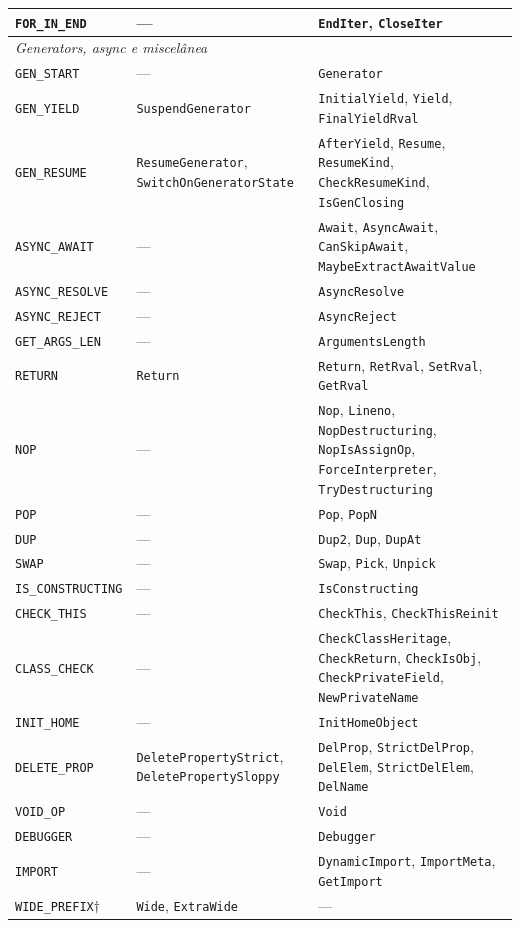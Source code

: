 {\begin{longtable}{@{}p{4.2cm}p{5.3cm}p{5.3cm}@{}}
\texttt{FOR\_IN\_END} & --- & \texttt{EndIter}, \texttt{CloseIter} \\
\midrule
\multicolumn{3}{l}{\textit{Generators, async e miscelânea}} \\
\midrule
\texttt{GEN\_START} & --- & \texttt{Generator} \\
\texttt{GEN\_YIELD} & \texttt{SuspendGenerator} & \texttt{InitialYield}, \texttt{Yield}, \texttt{FinalYieldRval} \\
\texttt{GEN\_RESUME} & \texttt{ResumeGenerator}, \texttt{SwitchOnGeneratorState} & \texttt{AfterYield}, \texttt{Resume}, \texttt{ResumeKind}, \texttt{CheckResumeKind}, \texttt{IsGenClosing} \\
\texttt{ASYNC\_AWAIT} & --- & \texttt{Await}, \texttt{AsyncAwait}, \texttt{CanSkipAwait}, \texttt{MaybeExtractAwaitValue} \\
\texttt{ASYNC\_RESOLVE} & --- & \texttt{AsyncResolve} \\
\texttt{ASYNC\_REJECT} & --- & \texttt{AsyncReject} \\
\texttt{GET\_ARGS\_LEN} & --- & \texttt{ArgumentsLength} \\
\texttt{RETURN} & \texttt{Return} & \texttt{Return}, \texttt{RetRval}, \texttt{SetRval}, \texttt{GetRval} \\
\texttt{NOP} & --- & \texttt{Nop}, \texttt{Lineno}, \texttt{NopDestructuring}, \texttt{NopIsAssignOp}, \texttt{ForceInterpreter}, \texttt{TryDestructuring} \\
\texttt{POP} & --- & \texttt{Pop}, \texttt{PopN} \\
\texttt{DUP} & --- & \texttt{Dup2}, \texttt{Dup}, \texttt{DupAt} \\
\texttt{SWAP} & --- & \texttt{Swap}, \texttt{Pick}, \texttt{Unpick} \\
\texttt{IS\_CONSTRUCTING} & --- & \texttt{IsConstructing} \\
\texttt{CHECK\_THIS} & --- & \texttt{CheckThis}, \texttt{CheckThisReinit} \\
\texttt{CLASS\_CHECK} & --- & \texttt{CheckClassHeritage}, \texttt{CheckReturn}, \texttt{CheckIsObj}, \texttt{CheckPrivateField}, \texttt{NewPrivateName} \\
\texttt{INIT\_HOME} & --- & \texttt{InitHomeObject} \\
\texttt{DELETE\_PROP} & \texttt{DeletePropertyStrict}, \texttt{DeletePropertySloppy} & \texttt{DelProp}, \texttt{StrictDelProp}, \texttt{DelElem}, \texttt{StrictDelElem}, \texttt{DelName} \\
\texttt{VOID\_OP} & --- & \texttt{Void} \\
\texttt{DEBUGGER} & --- & \texttt{Debugger} \\
\texttt{IMPORT} & --- & \texttt{DynamicImport}, \texttt{ImportMeta}, \texttt{GetImport} \\
\texttt{WIDE\_PREFIX}$\dagger$ & \texttt{Wide}, \texttt{ExtraWide} & --- \\
\bottomrule
\end{longtable}
}

